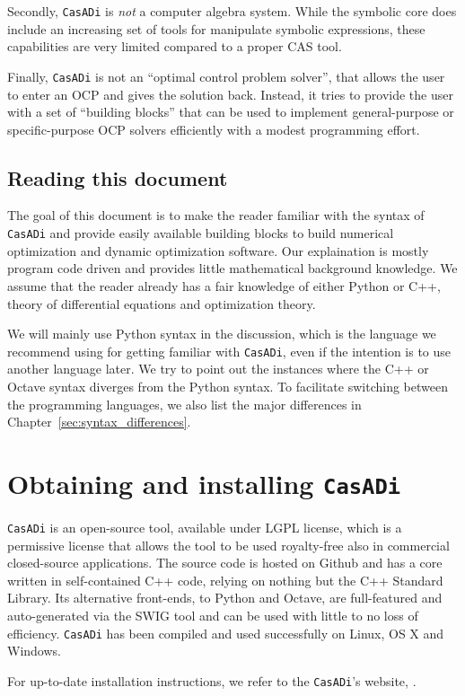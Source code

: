 \documentclass[a4paper,12pt]{book}
\newcommand{\CasADi}{\texttt{CasADi}\xspace}
\begin{document}
Secondly, \CasADi is \emph{not} a computer algebra system. While the symbolic core does include an increasing set of tools for manipulate symbolic expressions, these capabilities are very limited compared to a proper CAS tool.

Finally, \CasADi is not an ``optimal control problem solver'', that allows the user to enter an OCP and gives the solution back. Instead, it tries to provide the user with a set of ``building blocks'' that can be used to implement general-purpose or specific-purpose OCP solvers efficiently with a modest programming effort.

\section{Reading this document}
The goal of this document is to make the reader familiar with the syntax of \CasADi and provide easily available building blocks to build numerical optimization and dynamic optimization software. Our explaination is mostly program code driven and provides little mathematical background knowledge. We assume that the reader already has a fair knowledge of either Python or C++, theory of differential equations and optimization theory. 

We will mainly use Python syntax in the discussion, which is the language we recommend using for getting familiar with \CasADi, even if the intention is to use another language later. We try to point out the instances where the C++ or Octave syntax diverges from the Python syntax. To facilitate switching between the programming languages, we also list the major differences in Chapter~\ref{sec:syntax_differences}.

\chapter{Obtaining and installing \CasADi}
\CasADi is an open-source tool, available under LGPL license, which is a permissive license that allows the tool to be used royalty-free also in commercial closed-source applications. The source code is hosted on Github and has a core written in self-contained C++ code, relying on nothing but the C++ Standard Library. Its alternative front-ends, to Python and Octave, are full-featured and auto-generated via the SWIG tool and can be used with little to no loss of efficiency. \CasADi has been compiled and used successfully on Linux, OS X and Windows.

For up-to-date installation instructions, we refer to the \CasADi's website, .
\end{document}
